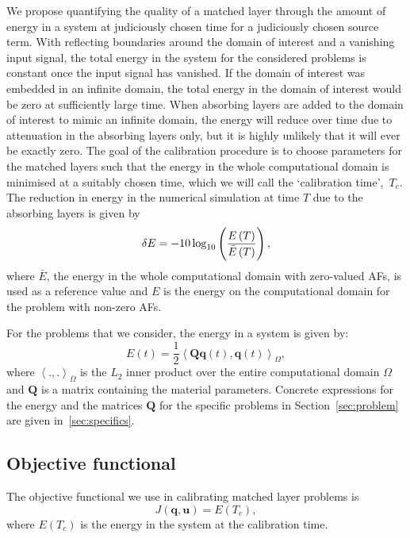 \documentclass[a4paper]{article}
\renewcommand{\vec}{\boldsymbol}
\begin{document}
We propose quantifying the quality of a matched layer through the
amount of energy in a system at judiciously chosen time for a
judiciously chosen source term.  With reflecting boundaries around the
domain of interest and a vanishing input signal, the total energy in
the system for the considered problems is constant once the input
signal has vanished. If the domain of interest was embedded in an
infinite domain, the total energy in the domain of interest would be
zero at sufficiently large time. When absorbing layers are added to
the domain of interest to mimic an infinite domain, the energy will
reduce over time due to attenuation in the absorbing layers only, but
it is highly unlikely that it will ever be exactly zero. The goal of
the calibration procedure is to choose parameters for the matched
layers such that the energy in the whole computational domain is
minimised at a suitably chosen time, which we will call the
`calibration time',~$T_{c}$.  The reduction in energy in the numerical
simulation at time $T$ due to the absorbing layers is given by
\begin{equation}
  \delta E = -10 \log_{10}
  \del{\frac{E\del{T}}{\bar{E}\del{T}}},
  \label{eq:energyreduction}
\end{equation}
where $\bar{E}$, the energy in the whole computational domain with
zero-valued AFs, is used as a reference value and $E$ is the energy on
the computational domain for the problem with non-zero AFs.

For the problems that we consider, the energy in a system is given by:
\begin{equation}
  E(t) = \frac{1}{2} \left<\vec{Q} \vec{q}(t), \vec{q}(t)
  \right>_\Omega,
  \label{eq:generalenergy}
\end{equation}
where $\left<., . \right>_\Omega$ is the $L_2$ inner product over the
entire computational domain $\Omega$ and $\vec{Q}$ is a matrix
containing the material parameters. Concrete expressions for the
energy and the matrices $\vec{Q}$ for the specific problems in
Section~\ref{sec:problem} are given in~\ref{sec:specifics}.

\subsection{Objective functional}
\label{sec:objective}

The objective functional we use in calibrating matched layer problems is
\begin{equation}
  J(\vec{q}, \vec{u}) = E(T_{c}),
  \label{eq:objective}
\end{equation}
where $E(T_{c})$ is the energy in the system at the calibration time.
\end{document}
